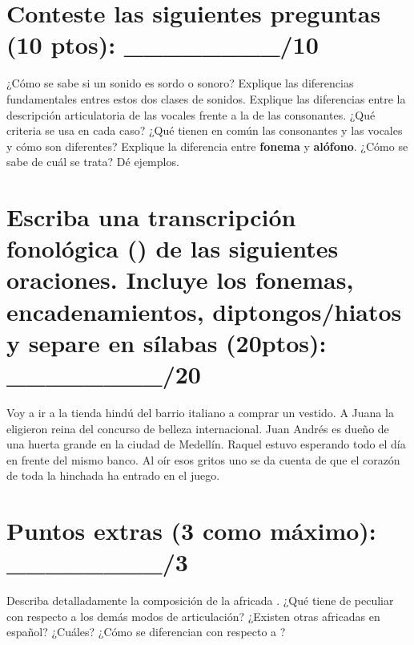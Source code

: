 \documentclass[12pt]{exam}
\begin{document}
\section{Conteste las siguientes preguntas (10 ptos): \_\_\_\_\_\_\_\_/10}
	\begin{questions}
		\question ¿Cómo se sabe si un sonido es sordo o sonoro? Explique las diferencias fundamentales entres estos dos clases de sonidos. 
		\fillwithlines{2in}
		\question Explique las diferencias entre la descripción articulatoria de las vocales frente a la de las consonantes. ¿Qué criteria se usa en cada caso? ¿Qué tienen en común las consonantes y las vocales y cómo son diferentes?
		\fillwithlines{2in}
		\question Explique la diferencia entre \textbf{fonema} y \textbf{alófono}. ¿Cómo se sabe de cuál se trata? Dé ejemplos.
		\fillwithlines{2in}
	\end{questions}


\section{Escriba una transcripción fonológica () de las siguientes oraciones. Incluye los fonemas, encadenamientos, diptongos/hiatos y separe en sílabas (20ptos): \_\_\_\_\_\_\_\_/20 }

	\begin{questions}
		\question Voy a ir a la tienda hindú del barrio italiano a comprar un vestido.
		\fillwithlines{.5in}
		\question A Juana la eligieron reina del concurso de belleza internacional.
		\fillwithlines{.5in}
		\question Juan Andrés es dueño de una huerta grande en la ciudad de Medellín.
		\fillwithlines{.5in}
		\question Raquel estuvo esperando todo el día en frente del mismo banco. 
		\fillwithlines{.5in}
		\question Al oír esos gritos uno se da cuenta de que el corazón de toda la hinchada ha entrado en el juego. 
		\fillwithlines{.5in}
	\end{questions}



\section{Puntos extras (3 como máximo): \_\_\_\_\_\_\_\_/3 }
\begin{questions}
	\question Describa detalladamente la composición de la africada \textipa{/\textteshlig/}. ¿Qué tiene de peculiar con respecto a los demás modos de articulación? ¿Existen otras africadas en español? ¿Cuáles? ¿Cómo se diferencian con respecto a \textipa{/\textteshlig/}?
	\fillwithlines{2in}
\end{questions}






	
\end{document}
